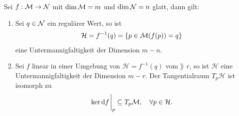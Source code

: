\begin{kor}
Sei $f: \mathcal{M} \to \mathcal{N}$ mit $\dim \mathcal{M} = m$ und $\dim \mathcal{N} = n$ glatt, dann gilt:
\begin{enumerate}
\item Sei $q \in \mathcal{N}$ ein regulärer Wert, so ist 
\begin{align}
\mathcal{H} = f^{-1}(q) = \{ p \in \mathcal{M} (f(p))=q \}
\end{align}
eine Untermannigfaltigkeit der Dimension $m-n$.
\item Sei $f$ linear in einer Umgebung von $\mathcal{H} = f^{-1}(q)$ vom $\rang$ $r$, so ist $\mathcal{H}$ eine Untermannigfaltigkeit der Dimension $m-r$.
Der Tangentialraum $T_p \mathcal{H}$ ist isomorph zu
\begin{align}
\ker \dd f \eval_p \subseteq \tspace{p}, \quad \forall p \in \mathcal{H}.
\end{align}
\end{enumerate} 
\end{kor}